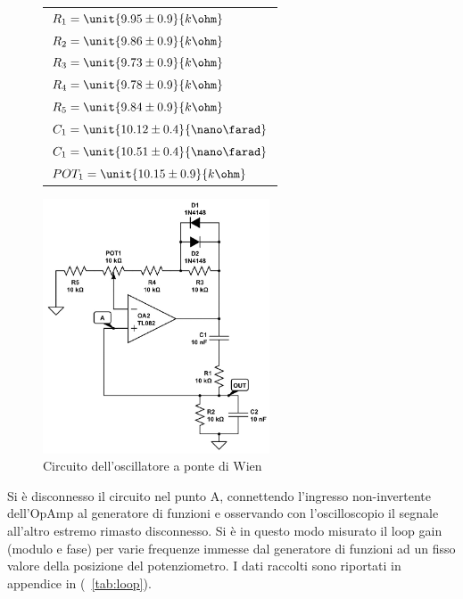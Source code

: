 \documentclass[10pt,a4paper]{article}
\begin{document}
\begin{figure}[H]
	\begin{minipage}{0.28\textwidth}
		\centering
		\begin{tabular}{l}
			$R_1 = \unit{9.95 \pm 0.9}{k\ohm}$ \\
			$R_2 = \unit{9.86 \pm 0.9}{k\ohm}$ \\
			$R_3 = \unit{9.73 \pm 0.9}{k\ohm}$ \\
			$R_4 = \unit{9.78 \pm 0.9}{k\ohm}$ \\
			$R_5 = \unit{9.84 \pm 0.9}{k\ohm}$ \\
			$C_1 = \unit{10.12 \pm 0.4}{\nano\farad}$ \\
			$C_1 = \unit{10.51 \pm 0.4}{\nano\farad}$ \\
			$POT_1 = \unit{10.15 \pm 0.9}{k\ohm}$ \\
		\end{tabular}
	\end{minipage}
	\begin{minipage}{0.75\textwidth}
		\centering
		\includegraphics[width=0.6\textwidth]{../grafici/circuito.jpg}
		\caption{Circuito dell'oscillatore a ponte di Wien}
		\label{circuito}
	\end{minipage}
\end{figure}

Si è disconnesso il circuito nel punto A, connettendo l'ingresso non-invertente dell'OpAmp al generatore di funzioni e osservando con l'oscilloscopio il segnale all'altro estremo rimasto disconnesso.
Si è in questo modo misurato il loop gain (modulo e fase) per varie frequenze immesse dal generatore di funzioni ad un fisso valore della posizione del potenziometro. I dati raccolti sono riportati in appendice in (\tablename{~\ref{tab:loop}}).
\end{document}
